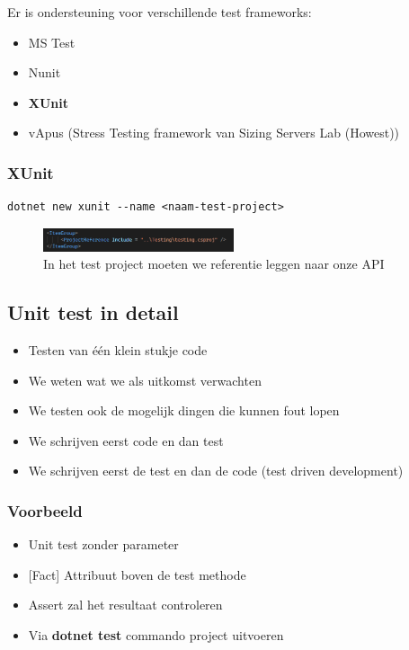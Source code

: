 \documentclass{article}
\begin{document}
Er is ondersteuning voor verschillende test frameworks:

\begin{itemize}
    \item MS Test
    \item Nunit
    \item \textbf{XUnit}
    \item vApus (Stress Testing framework van Sizing Servers Lab (Howest))
\end{itemize}

\subsubsection{XUnit}

\begin{verbatim}
dotnet new xunit --name <naam-test-project>
\end{verbatim}

\begin{figure}[H]
    \centering
    \includegraphics[width=0.5\textwidth]{xunit.png}
    \caption{In het test project moeten we referentie leggen naar onze API}
\end{figure}

\subsection{Unit test in detail}

\begin{itemize}
    \item Testen van één klein stukje code
    \item We weten wat we als uitkomst verwachten
    \item We testen ook de mogelijk dingen die kunnen fout lopen
    \item We schrijven eerst code en dan test
    \item We schrijven eerst de test en dan de code (test driven development)
\end{itemize}

\subsubsection{Voorbeeld}

\begin{itemize}
    \item Unit test zonder parameter
    \item {[Fact]} Attribuut boven de test methode
    \item Assert zal het resultaat controleren
    \item Via \textbf{dotnet test} commando project uitvoeren
\end{itemize}
\end{document}
